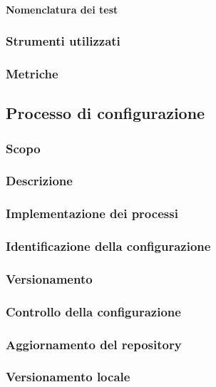 \paragraph{Nomenclatura dei test} 

\subsubsection{Strumenti utilizzati}

\subsubsection{Metriche}

\subsection{Processo di configurazione}
\subsubsection{Scopo}

\subsubsection{Descrizione}

\subsubsection{Implementazione dei processi}

\subsubsection{Identificazione della configurazione}

\subsubsection{Versionamento}


\subsubsection{Controllo della configurazione}

\subsubsection{Aggiornamento del repository} 

\subsubsection{Versionamento locale} 
